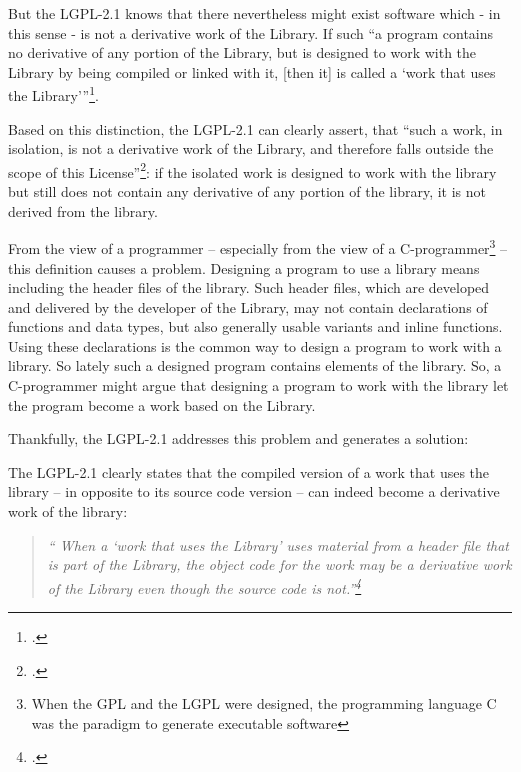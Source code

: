 But the LGPL-2.1 knows that there nevertheless might exist software which - in
this sense - is not a derivative work of the Library. If such \enquote{a
program contains no derivative of any portion of the Library, but is
designed to work with the Library by being compiled or linked with it, [then
it] is called a \enquote{work that uses the Library}}\footcite[cf.][\nopage wp
§5]{Lgpl21OsiLicense1999a}.

Based on this distinction, the LGPL-2.1 can clearly assert, that \enquote{such
a work, in isolation, is not a derivative work of the Library, and therefore
falls outside the scope of this License}\footcite[cf.][\nopage wp
§5]{Lgpl21OsiLicense1999a}: if the isolated work is designed to work with the
library but still does not contain any derivative of any portion of the library,
it is not derived from the library.

From the view of a programmer -- especially from the view of a
C-programmer\footnote{When the GPL and the LGPL were designed, the programming
language C was the paradigm to generate executable software} -- this definition
causes a problem. Designing a program to use a library means including the
header files of the library. Such header files, which are developed and
delivered by the developer of the Library, may not contain declarations of
functions and data types, but also generally usable variants and inline
functions. Using these declarations is the common way to design a program to
work with a library. So lately such a designed program contains elements of the
library. So, a C-programmer might argue that designing a program to work with
the library let the program become a work based on the Library.

Thankfully, the LGPL-2.1 addresses this problem and generates a solution:

The LGPL-2.1 clearly states that the compiled version of a work that uses the
library -- in opposite to its source code version -- can indeed become a
derivative work of the library: 

\begin{quote}\emph{\enquote{ When a \enquote{work that uses the Library} uses
material from a header file that is part of the Library, the object code for the
work may be a derivative work of the Library even though the source code is
not.}\footcite[cf.][\nopage wp §5]{Lgpl21OsiLicense1999a} }
\end{quote}


